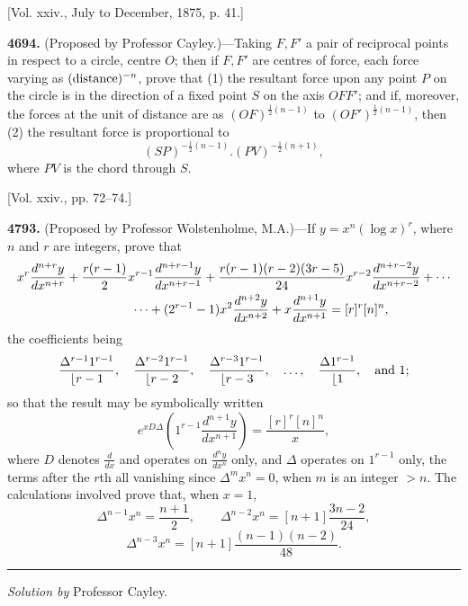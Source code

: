 \documentclass[10pt,twoside]{article}
\begin{document}
\begin{center}
[Vol. xxiv., July to December, 1875, p. 41.]
\end{center}

\noindent\textbf{4694.} (Proposed by Professor Cayley.)---Taking \(F,F'\) a pair
of reciprocal points in respect to a circle, centre \(O\); then if \(F,F'\) are
centres of force, each force varying as \((\hbox{distance})^{-n}\), prove that
(1) the resultant force upon any point \(P\) on the circle is in the direction
of a fixed point \(S\) on the axis \(OFF'\); and if, moreover, the forces at
the unit of distance are as \((OF)^{\frac12(n-1)}\) to
\((OF')^{\frac12(n-1)}\), then (2) the resultant force is proportional to
\[
        (SP)^{-\frac12(n-1)}.(PV)^{-\frac12(n+1)},
\]
where \(PV\) is the chord through \(S\).

\newpage

\begin{center}
[Vol. xxiv., pp. 72--74.]
\end{center}

\noindent\textbf{4793.} (Proposed by Professor Wolstenholme, M.A.)---If
\(y=x^n(\log x)^r\), where \(n\) and \(r\) are integers, prove that
\[
\begin{aligned}
&x^r\frac{d^{n+r}y}{dx^{n+r}}
 +\frac{r(r-1)}2x^{r-1}\frac{d^{n+r-1}y}{dx^{n+r-1}}
 +\frac{r(r-1)(r-2)(3r-5)}{24}x^{r-2}
   \frac{d^{n+r-2}y}{dx^{n+r-2}}+\cdots\\
&\hspace{3.2cm}\cdots +(2^{r-1}-1)x^2\frac{d^{n+2}y}{dx^{n+2}}
 +x\frac{d^{n+1}y}{dx^{n+1}}=[r]^r[n]^n,
\end{aligned}
\]
the coefficients being
\[
\frac{\Delta^{r-1}1^{r-1}}{\lfloor r-1},\quad
\frac{\Delta^{r-2}1^{r-1}}{\lfloor r-2},\quad
\frac{\Delta^{r-3}1^{r-1}}{\lfloor r-3},\quad \ldots,\quad
\frac{\Delta 1^{r-1}}{\lfloor 1},\quad\hbox{and }1;
\]
so that the result may be symbolically written
\[
 e^{xD\Delta}\left(1^{r-1}\frac{d^{n+1}y}{dx^{n+1}}\right)
     =\frac{[r]^r[n]^n}{x},
\]
where \(D\) denotes \(\frac{d}{dx}\) and operates on
\(\frac{d^ny}{dx^n}\) only, and \(\Delta\) operates on \(1^{r-1}\) only, the
terms after the \(r\)th all vanishing since \(\Delta^m x^n=0\), when \(m\) is
an integer \(>n\). The calculations involved prove that, when \(x=1\),
\[
 \Delta^{n-1}x^n=\frac{n+1}{2},\qquad
 \Delta^{n-2}x^n=[n+1]\frac{3n-2}{24},
\]
\[
 \Delta^{n-3}x^n=[n+1]\frac{(n-1)(n-2)}{48}.
\]

\begin{center}
\rule{0.25\linewidth}{0.4pt}

\textit{Solution by} Professor Cayley.
\end{center}
\end{document}
